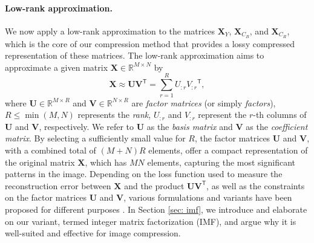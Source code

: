 \paragraph{Low-rank approximation.} 
We now apply a low-rank approximation to the matrices $\bm{X}_{Y}$, $\bm{X}_{C_B}$, and $\bm{X}_{C_R}$, which is the core of our compression method that provides a lossy compressed representation of these matrices.  The low-rank approximation \citep{eckart1936approximation} aims to approximate a given matrix $ \bm{X} \in \mathbb{R}^{M \times N} $ by 
\begin{equation} \label{eq: lra}
	\bm{X} \approx \bm{U} \bm{V}^\mathsf{T} = \sum_{r=1}^{R} U_{:r} {V_{:r}}^\mathsf{T},
\end{equation} 
where $\bm{U} \in \mathbb{R}^{M \times R}$ and $\bm{V} \in \mathbb{R}^{N \times R}$ are \emph{factor matrices} (or simply \emph{factors}), $R \leq \min(M,N)$ represents the \emph{rank}, $U_{:r}$ and $V_{:r}$ represent the $r$-th columns of $\bm{U}$ and $\bm{V}$, respectively. We refer to $\bm{U}$ as the \emph{basis matrix} and $\bm{V}$ as the \emph{coefficient matrix}. By selecting a sufficiently small value for $R$, the factor matrices $\bm{U}$ and $\bm{V}$, with a combined total of $(M+N)R$ elements, offer a compact representation of the original matrix $\bm{X}$, which has $MN$ elements, capturing the most significant patterns in the image. Depending on the loss function used to measure the reconstruction error between $\bm{X}$ and the product $\bm{U} \bm{V}^\mathsf{T}$, as well as the constraints on the factor matrices $\bm{U}$ and $\bm{V}$, various formulations and variants have been proposed for different purposes \cite{lee2000algorithms, ding2008convex, lin2005integer}. In Section \ref{sec: imf}, we introduce and elaborate on our variant, termed integer matrix factorization (IMF), and argue why it is well-suited and effective for image compression. 

